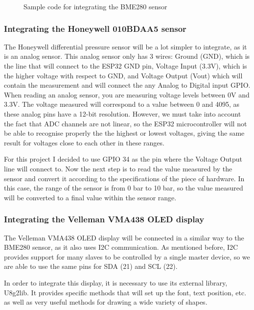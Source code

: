 \documentclass[12pt]{article}
\begin{document}
\begin{figure}[h]
\label{code:bme}

\centering
\caption{Sample code for integrating the BME280 sensor}
\end{figure}

\subsubsection{Integrating the Honeywell 010BDAA5 sensor}

The Honeywell differential pressure sensor will be a lot simpler to integrate, as it is an analog sensor. This analog sensor only has 3 wires: Ground (GND), which is the line that will connect to the ESP32 GND pin, Voltage Input (3.3V), which is the higher voltage with respect to GND, and Voltage Output (Vout) which will contain the measurement and will connect the any Analog to Digital input GPIO. When reading an analog sensor, you are measuring voltage levels between 0V and 3.3V. The voltage measured will correspond to a value between 0 and 4095, as these analog pins have a 12-bit resolution. However, we must take into account the fact that ADC channels are not linear, so the ESP32 microcontroller will not be able to recognise properly the the highest or lowest voltages, giving the same result for voltages close to each other in these ranges.\par

For this project I decided to use GPIO 34 as the pin where the Voltage Output line will connect to. Now the next step is to read the value measured by the sensor and convert it according to the specifications of the piece of hardware. In this case, the range of the sensor is from 0 bar to 10 bar, so the value measured will be converted to a final value within the sensor range.

\subsubsection{Integrating the Velleman VMA438 OLED display}

The Velleman VMA438 OLED display will be connected in a similar way to the BME280 sensor, as it also uses I2C communication. As mentioned before, I2C provides support for many slaves to be controlled by a single master device, so we are able to use the same pins for SDA (21) and SCL (22).\par

In order to integrate this display, it is necessary to use its external library, U8g2lib. It provides specific methods that will set up the font, text position, etc. as well as very useful methods for drawing a wide variety of shapes.
\end{document}
